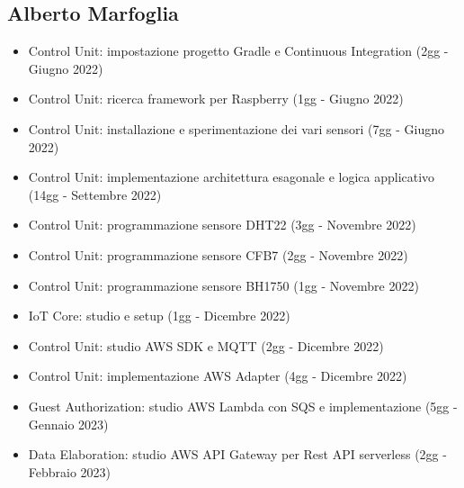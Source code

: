\subsection{Alberto Marfoglia}
\begin{itemize}
    \item Control Unit: impostazione progetto Gradle e Continuous Integration (2gg - Giugno 2022) 
    \item Control Unit: ricerca framework per Raspberry (1gg - Giugno 2022) 
    \item Control Unit: installazione e sperimentazione dei vari sensori (7gg - Giugno 2022)
    \item Control Unit: implementazione architettura esagonale e logica applicativo (14gg - Settembre 2022)
    \item Control Unit: programmazione sensore DHT22 (3gg - Novembre 2022)
    \item Control Unit: programmazione sensore CFB7 (2gg - Novembre 2022)
    \item Control Unit: programmazione sensore BH1750 (1gg - Novembre 2022)
    \item IoT Core: studio e setup (1gg - Dicembre 2022)
    \item Control Unit: studio AWS SDK e MQTT (2gg - Dicembre 2022)
    \item Control Unit: implementazione AWS Adapter (4gg - Dicembre 2022)
    \item Guest Authorization: studio AWS Lambda con SQS e implementazione (5gg - Gennaio 2023)
    \item Data Elaboration: studio AWS API Gateway per Rest API serverless (2gg - Febbraio 2023)
\end{itemize}

